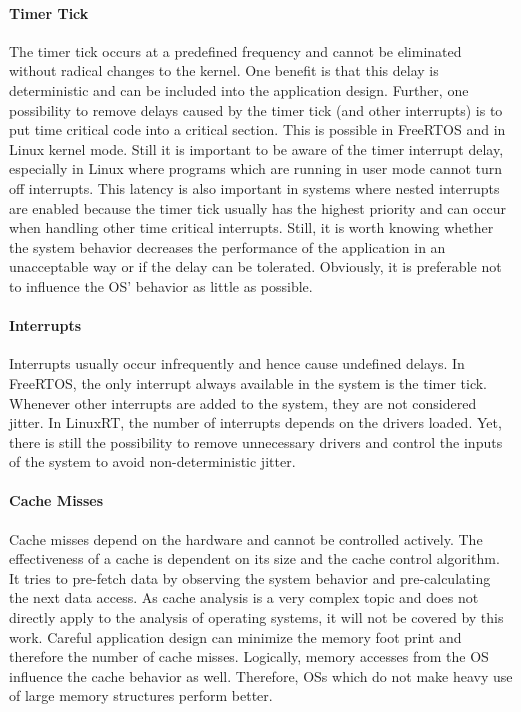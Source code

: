 \paragraph{Timer Tick} 
The timer tick occurs at a predefined frequency and cannot be eliminated without radical changes to the kernel.
One benefit is that this delay is deterministic and can be included into the application design. 
Further, one possibility to remove delays caused by the timer tick (and other interrupts) is to put time critical code into a critical section.
This is possible in FreeRTOS and in Linux kernel mode.
Still it is important to be aware of the timer interrupt delay, especially in Linux where programs which are running in user mode cannot turn off interrupts. 
This latency is also important in systems where nested interrupts are enabled because the timer tick usually has the highest priority and can occur when handling other time critical interrupts. 
Still, it is worth knowing whether the system behavior decreases the performance of the application in an unacceptable way or if the delay can be tolerated.
Obviously, it is preferable not to influence the \ac{OS}' behavior as little as possible.         

\paragraph{Interrupts}
Interrupts usually occur infrequently and hence cause undefined delays. 
In FreeRTOS, the only interrupt always available in the system is the timer tick.
Whenever other interrupts are added to the system, they are not considered jitter.
In LinuxRT, the number of interrupts depends on the drivers loaded. 
Yet, there is still the possibility to remove unnecessary drivers and control the inputs of the system to avoid non-deterministic jitter.

\paragraph{Cache Misses}
Cache misses depend on the hardware and cannot be controlled actively.
The effectiveness of a cache is dependent on its size and the cache control algorithm.
It tries to pre-fetch data by observing the system behavior and pre-calculating the next data access.
As cache analysis is a very complex topic and does not directly apply to the analysis of operating systems, it will not be covered by this work.
Careful application design can minimize the memory foot print and therefore the number of cache misses.
Logically, memory accesses from the \ac{OS} influence the cache behavior as well. 
Therefore, \acp{OS} which do not make heavy use of large memory structures perform better. 

